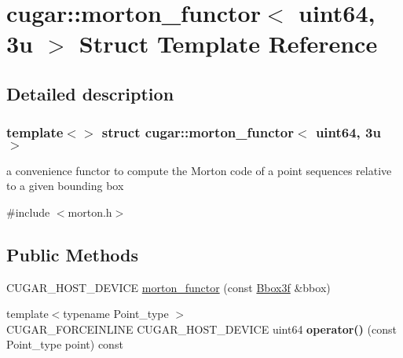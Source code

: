 \hypertarget{structcugar_1_1morton__functor_3_01uint64_00_013u_01_4}{}\section{cugar\+:\+:morton\+\_\+functor$<$ uint64, 3u $>$ Struct Template Reference}
\label{structcugar_1_1morton__functor_3_01uint64_00_013u_01_4}


\subsection{Detailed description}
\subsubsection*{template$<$$>$\newline
struct cugar\+::morton\+\_\+functor$<$ uint64, 3u $>$}

a convenience functor to compute the Morton code of a point sequences relative to a given bounding box 

{\ttfamily \#include $<$morton.\+h$>$}

\subsection*{Public Methods}
\begin{DoxyCompactItemize}
\item 
C\+U\+G\+A\+R\+\_\+\+H\+O\+S\+T\+\_\+\+D\+E\+V\+I\+CE \hyperlink{structcugar_1_1morton__functor_3_01uint64_00_013u_01_4_a6e419b3856553261495352b81ed4e189}{morton\+\_\+functor} (const \hyperlink{structcugar_1_1_bbox}{Bbox3f} \&bbox)
\item 
\mbox{\label{structcugar_1_1morton__functor_3_01uint64_00_013u_01_4_a8d1ac0e4cc5ee237591f5b4ce2746368}} 
{\footnotesize template$<$typename Point\+\_\+type $>$ }\\C\+U\+G\+A\+R\+\_\+\+F\+O\+R\+C\+E\+I\+N\+L\+I\+NE C\+U\+G\+A\+R\+\_\+\+H\+O\+S\+T\+\_\+\+D\+E\+V\+I\+CE uint64 {\bfseries operator()} (const Point\+\_\+type point) const
\end{DoxyCompactItemize}
